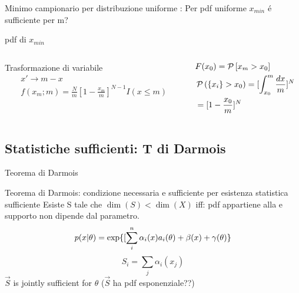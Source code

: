 \documentclass[asd-beamer.tex]{subfiles}
\begin{document}
\begin{wordonframe}{Minimo campionario per distribuzione uniforme}
: Per pdf uniforme $x_{min}$ \'e sufficiente per m?
\end{wordonframe}

\begin{wordonframe}{}
pdf di $x_{min}$
\begin{columns}[T]
\begin{column}{0.5\textwidth}
Trasformazione di variabile
\begin{align*}
&x'\to m-x\\
&f(x_m;m)=\frac{N}{m}[1-\frac{x_m}{m}]^{N-1}I(x\leq m)
\end{align*}
\end{column}
\begin{column}{0.5\textwidth}
\begin{align*}
&F(x_0)=\operatorname{\mathcal{P}}{[x_m>x_0]}\\
&\operatorname{\mathcal{P}}{(\{x_i\}>x_0)}=[\int_{x_0}^m\frac{dx}{m}]^N\\
&=[1-\frac{x_0}{m}]^N
\end{align*}
\end{column}
\end{columns}
\end{wordonframe}

\subsection{Statistiche sufficienti: T di Darmois}

\begin{frame}{Teorema di Darmois}\frameintoc
\begin{block}{Teorema di Darmois: condizione necessaria e sufficiente per esistenza statistica sufficiente}
Esiste S tale che $\dim{(S)}<\dim{(X)}$ iff: pdf appartiene alla  e supporto non dipende dal parametro.
\begin{equation*}
p(x|\theta)=\text{exp}\{[\sum_i^n\alpha_i(x)a_i(\theta)+\beta(x)+\gamma(\theta)\}
\end{equation*}
\begin{equation*}
S_i=\sum_j\alpha_i(x_j)
\end{equation*}
$\vec{S}$ is jointly sufficient for $\theta$ ($\vec{S}$ ha pdf esponenziale??)
\end{block}
\end{frame}
\end{document}
